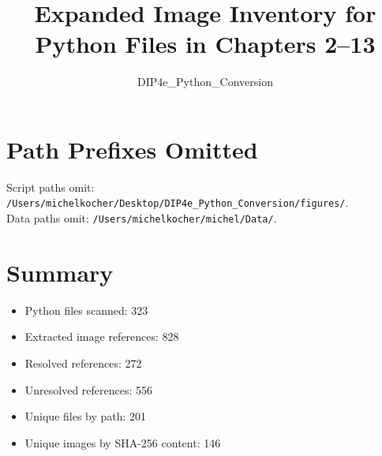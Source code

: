 \documentclass[11pt]{article}
\begin{document}
\title{Expanded Image Inventory for Python Files in Chapters 2--13}
\author{DIP4e\_Python\_Conversion}
\date{}
\maketitle
\section*{Path Prefixes Omitted}
Script paths omit: \texttt{/Users/michelkocher/Desktop/DIP4e\_Python\_Conversion/figures/}.\\
Data paths omit: \texttt{/Users/michelkocher/michel/Data/}.
\section*{Summary}
\begin{itemize}
\item Python files scanned: 323
\item Extracted image references: 828
\item Resolved references: 272
\item Unresolved references: 556
\item Unique files by path: 201
\item Unique images by SHA-256 content: 146
\end{itemize}
\end{document}

